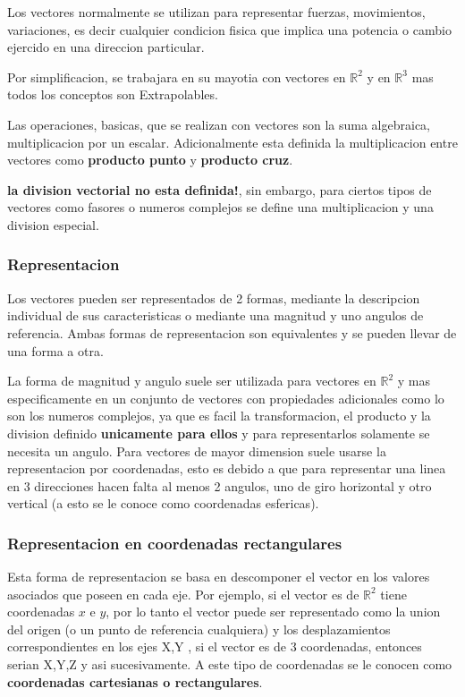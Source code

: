     Los vectores normalmente se utilizan para representar fuerzas, movimientos,
    variaciones, es decir cualquier condicion fisica que implica una potencia o
    cambio ejercido en una direccion particular.

    Por simplificacion, se trabajara en su mayotia con vectores en
    $\mathbb{R}^2$ y en $\mathbb{R}^3$ mas todos los conceptos son
    Extrapolables.

    Las operaciones, basicas, que se realizan con vectores son la suma
    algebraica, multiplicacion por un escalar. Adicionalmente esta definida la
    multiplicacion entre vectores como \textbf{producto punto} y
    \textbf{producto cruz}.

    \textbf{la division vectorial no esta definida!}, sin embargo, para ciertos
    tipos de vectores como fasores o numeros complejos se define una
    multiplicacion y una division especial.



    \subsubsection{Representacion}

    Los vectores pueden ser representados de 2 formas, mediante la descripcion
    individual de sus caracteristicas o mediante una magnitud y uno angulos de
    referencia. Ambas formas de representacion son equivalentes y se pueden
    llevar de una forma a otra.

    La forma de magnitud y angulo suele ser utilizada para vectores en
    $\mathbb{R}^2$ y mas especificamente en un conjunto de vectores con propiedades
    adicionales como lo son los numeros complejos, ya que es facil la
    transformacion, el producto y la division definido \textbf{unicamente para
    ellos} y para representarlos solamente se necesita un
    angulo. Para vectores de mayor dimension suele usarse la representacion por
    coordenadas, esto es debido a que para representar una linea en 3
    direcciones hacen falta al menos 2 angulos, uno de giro horizontal y otro
    vertical (a esto se le conoce como coordenadas esfericas).


    \subsubsection{Representacion en coordenadas rectangulares}

    Esta forma de representacion se basa en descomponer el vector en los
    valores asociados que poseen en cada eje. Por ejemplo, si el vector es de
    $\mathbb{R}^2$ tiene coordenadas $x$ e $y$, por lo tanto el vector puede
    ser representado como la union del origen (o un punto de referencia
    cualquiera) y los desplazamientos correspondientes en los ejes X,Y , si el
    vector es de 3 coordenadas, entonces serian X,Y,Z y asi sucesivamente. A
    este tipo de coordenadas se le conocen como \textbf{ coordenadas
    cartesianas o rectangulares}.

